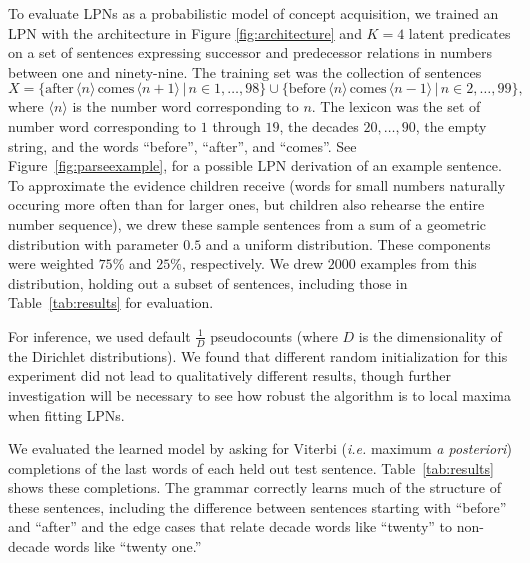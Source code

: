 \documentclass{article} %
\begin{document}
To evaluate LPNs as a probabilistic model of concept acquisition, we
trained an LPN with the architecture in Figure \ref{fig:architecture}
and $K = 4$ latent predicates on a set of sentences expressing
successor and predecessor relations in numbers between one and
ninety-nine. The training set was the collection of sentences $$X =
\{\text{after}\, \langle n \rangle \, \text{comes} \, \langle n+1
\rangle \,|\, n \in 1,\dots,98\} \cup \{\text{before} \,\langle n
\rangle \, \text{comes} \, \langle n-1 \rangle \,|\, n \in
2,\dots,99\},$$ where $\langle n \rangle$ is the number word
corresponding to $n$. The lexicon was the set of number word
corresponding to $1$ through $19$, the decades $20, \dots, 90$, the
empty string, and the words ``before'', ``after'', and ``comes''. See
Figure~\ref{fig:parseexample}, for a possible LPN derivation of an
example sentence. To approximate the evidence children receive (words
for small numbers naturally occuring more often than for larger ones,
but children also rehearse the entire number sequence), we drew these
sample sentences from a sum of a geometric distribution with parameter
$0.5$ and a uniform distribution. These components were weighted
$75\%$ and $25\%$, respectively. We drew $2000$ examples from this
distribution, holding out a subset of sentences, including those in
Table~\ref{tab:results} for evaluation.

For inference, we used default $\frac{1}{D}$ pseudocounts (where $D$ is the
dimensionality of the Dirichlet distributions). We found that different random
initialization for this experiment did not lead to qualitatively different
results, though further investigation will be necessary to see how
robust the algorithm is to local maxima when fitting LPNs.

We evaluated the learned model by asking for Viterbi ({\it i.e.} maximum {\it a
posteriori}) completions of the last words of each held out test
sentence. Table~\ref{tab:results} shows these completions. The grammar
correctly learns much of the structure of these sentences, including
the difference between sentences starting with ``before'' and
``after'' and the edge cases that relate decade words like ``twenty''
to non-decade words like ``twenty one.''
\end{document}
